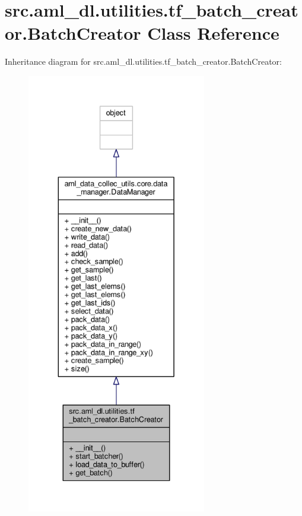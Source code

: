 \hypertarget{classsrc_1_1aml__dl_1_1utilities_1_1tf__batch__creator_1_1_batch_creator}{\section{src.\-aml\-\_\-dl.\-utilities.\-tf\-\_\-batch\-\_\-creator.\-Batch\-Creator Class Reference}
\label{classsrc_1_1aml__dl_1_1utilities_1_1tf__batch__creator_1_1_batch_creator}
}


Inheritance diagram for src.\-aml\-\_\-dl.\-utilities.\-tf\-\_\-batch\-\_\-creator.\-Batch\-Creator\-:
\nopagebreak
\begin{figure}[H]
\begin{center}
\leavevmode
\includegraphics[height=550pt]{classsrc_1_1aml__dl_1_1utilities_1_1tf__batch__creator_1_1_batch_creator__inherit__graph}
\end{center}
\end{figure}


